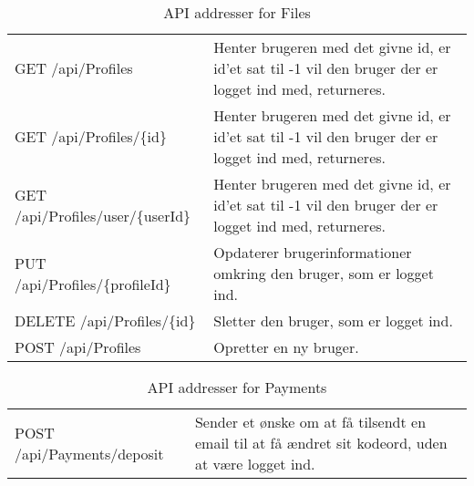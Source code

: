 \begin{table}[H]
	\centering
	\caption{API addresser for Files}
	\label{tab:web_user}
	\begin{tabular}{|L{0.3\textwidth}|L{0.70\textwidth}|}
		\hline
		\\
		\hline
		GET \newline
		/api/Profiles &
		Henter brugeren med det givne id, er id'et sat til -1 vil den bruger der er logget ind med, returneres. \\
        \hline
        GET \newline
		/api/Profiles/\{id\} &
		Henter brugeren med det givne id, er id'et sat til -1 vil den bruger der er logget ind med, returneres. \\
        \hline
        GET \newline
		/api/Profiles/user/\{userId\} &
		Henter brugeren med det givne id, er id'et sat til -1 vil den bruger der er logget ind med, returneres. \\
		\hline
		PUT \newline
		/api/Profiles/\{profileId\} &
		Opdaterer brugerinformationer omkring den bruger, som er logget ind. \\
		\hline
		DELETE \newline
		/api/Profiles/\{id\} &
		Sletter den bruger, som er logget ind. \\
		\hline
		POST \newline
		/api/Profiles &
		Opretter en ny bruger. \\
		\hline
	
	\end{tabular}
\end{table}

\begin{table}[H]
	\centering
	\caption{API addresser for Payments}
	\label{tab:web_user}
	\begin{tabular}{|L{0.3\textwidth}|L{0.70\textwidth}|}
		\hline
		\\
		\hline
		POST \newline
		/api/Payments/deposit &
		Sender et ønske om at få tilsendt en email til at få ændret sit kodeord, uden at være logget ind. 
		\\
		\hline
	\end{tabular}
\end{table}

